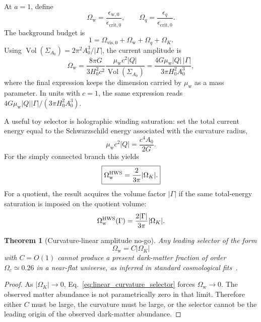 \documentclass[
  aps,
  prd,
  reprint,
  superscriptaddress,
  floatfix,
  nofootinbib,
  longbibliography
]{revtex4-2}
\theoremstyle{plain}
\newtheorem{theorem}{Theorem}
\theoremstyle{definition}
\theoremstyle{remark}
\newcommand{\vis}{\mathrm{vis}}
\newcommand{\w}{\mathrm w}
\newcommand{\crit}{\mathrm{crit}}
\newcommand{\Ok}{\Omega_K}
\newcommand{\Ow}{\Omega_{\mathrm w}}
\newcommand{\Oq}{\Omega_q}
\newcommand{\Vol}{\operatorname{Vol}}
\newcommand{\eps}{\epsilon}
\begin{document}
At \(a=1\), define
\begin{equation}
\Ow=\frac{\eps_{\w,0}}{\eps_{\crit,0}},
\qquad
\Oq=\frac{\eps_q}{\eps_{\crit,0}} .
\label{eq:Omega_definitions}
\end{equation}
The background budget is
\begin{equation}
1=\Omega_{\vis,0}+\Ow+\Oq+\Ok .
\label{eq:budget}
\end{equation}
Using \(\Vol(\Sigma_{A_0})=2\pi^2A_0^3/|\Gamma|\), the current amplitude is
\begin{equation}
\Ow=
\frac{8\pi G}{3H_0^2c^2}
\frac{\mu_{\w}c^2|Q|}{\Vol(\Sigma_{A_0})}
=
\frac{4G\mu_{\w}|Q|\,|\Gamma|}{3\pi H_0^2 A_0^3},
\label{eq:current_Omega_budget}
\end{equation}
where the final expression keeps the dimension carried by \(\mu_{\w}\) as a mass parameter.  In units with \(c=1\), the same expression reads \(4G\mu_{\w}|Q||\Gamma|/(3\pi H_0^2A_0^3)\).

A useful toy selector is holographic winding saturation: set the total current energy equal to the Schwarzschild energy associated with the curvature radius,
\begin{equation}
\mu_{\w}c^2|Q|=\frac{c^4A_0}{2G}.
\label{eq:HWS_energy}
\end{equation}
For the simply connected branch this yields
\begin{equation}
\boxed{
\Omega_{\w}^{\rm HWS}=\frac{2}{3\pi}|\Omega_K|.
}
\label{eq:HWS}
\end{equation}
For a quotient, the result acquires the volume factor \(|\Gamma|\) if the same total-energy saturation is imposed on the quotient volume:
\begin{equation}
\Omega_{\w}^{\rm HWS}(\Gamma)=
\frac{2|\Gamma|}{3\pi}|\Omega_K|.
\label{eq:HWS_quotient}
\end{equation}

\begin{theorem}[Curvature-linear amplitude no-go]
Any leading selector of the form
\begin{equation}
\Omega_{\w}=C|\Omega_K|
\label{eq:linear_curvature_selector}
\end{equation}
with \(C=O(1)\) cannot produce a present dark-matter fraction of order \(\Omega_c\simeq0.26\) in a near-flat universe, as inferred in standard cosmological fits~\cite{Planck2018}.
\end{theorem}

\begin{proof}
As \(|\Omega_K|\to0\), Eq.~\eqref{eq:linear_curvature_selector} forces \(\Omega_{\w}\to0\).  The observed matter abundance is not parametrically zero in that limit.  Therefore either \(C\) must be large, the curvature must be large, or the selector cannot be the leading origin of the observed dark-matter abundance.
\end{proof}
\end{document}
